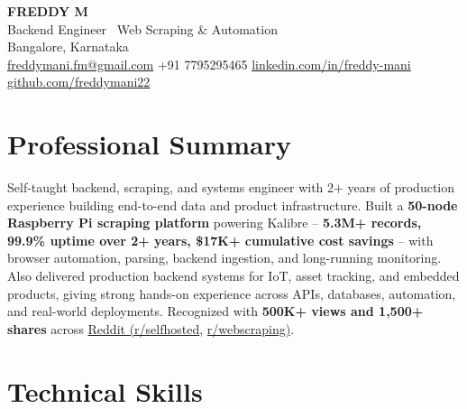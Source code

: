 \documentclass[letterpaper,10.5pt]{article}
\begin{document}
\begin{center}
  {\LARGE \textbf{FREDDY M}}\\[2pt]
  {\small Backend Engineer \textbar\ Web Scraping \& Automation}\\[2pt]
  Bangalore, Karnataka\\[2pt]
  \href{mailto:freddymani.fm@gmail.com}{freddymani.fm@gmail.com} \quad
  +91 7795295465 \quad
  \href{https://www.linkedin.com/in/freddy-mani/}{linkedin.com/in/freddy-mani} \quad
  \href{https://github.com/freddymani22}{github.com/freddymani22}
\end{center}

\section{Professional Summary}

\small{
Self-taught backend, scraping, and systems engineer with 2+ years of production experience building end-to-end data and product infrastructure. Built a \textbf{50-node Raspberry Pi scraping platform} powering Kalibre -- \textbf{5.3M+ records, 99.9\% uptime over 2+ years, \$17K+ cumulative cost savings} -- with browser automation, parsing, backend ingestion, and long-running monitoring. Also delivered production backend systems for IoT, asset tracking, and embedded products, giving strong hands-on experience across APIs, databases, automation, and real-world deployments. Recognized with \textbf{500K+ views and 1,500+ shares} across \href{https://www.reddit.com/r/selfhosted/comments/1rsflyj/fully_selfhosted_distributed_scraping/}{Reddit (r/selfhosted}, \href{https://www.reddit.com/r/webscraping/comments/1rqsvgp/python_selenium_at_scale_50_nodes_39m_records/}{r/webscraping)}.
}

\section{Technical Skills}
\end{document}
